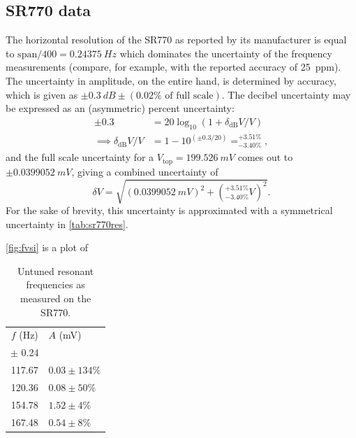 \documentclass{article}
\begin{document}
\subsection{SR770 data}
The horizontal resolution of the SR770 as reported by its manufacturer is equal to $\text{span}/400=\qty{0.24375}{Hz}$ which dominates the uncertainty of the frequency measurements (compare, for example, with the reported accuracy of \qty{25}{ppm}). The uncertainty in amplitude, on the entire hand, is determined by accuracy, which is given as $\pm\qty{0.3}{dB}\pm (0.02\%\text{ of full scale})$. The decibel uncertainty may be expressed as an (asymmetric) percent uncertainty:
\begin{equation*}
	\begin{aligned}
		\pm 0.3 &= 20 \log_{10}\left( 1 + \delta_\text{dB}V/V \right) \\
		\implies \delta_\text{dB}V/V &= 1- 10^{(\pm0.3/20)} = ^{+3.51\%}_{-3.40\%}%
,
	\end{aligned}
\end{equation*}
and the full scale uncertainty for a $V_\text{top}=\qty{199.526}{mV}$ comes out to $\pm \qty{0.0399052}{mV}$, giving a combined uncertainty of 
\begin{equation*}
	\delta V = \sqrt{\left( \qty{0.0399052}{mV} \right)^2 + \left( ^{+3.51\%}_{-3.40\%} V \right)^2}.
\end{equation*}
For the sake of brevity, this uncertainty is approximated with a symmetrical uncertainty in \autoref{tab:sr770res}.

\autoref{fig:fvsi} is a plot of 



\begin{table}
  \centering
  \caption{Untuned resonant frequencies as measured on the SR770.}
  \begin{tabular}{@{}cl@{}}
    \toprule
    $f$ (\unit{Hz}) & $A$ (\unit{mV}) \\
	$\pm$ 0.24 & \\
    \midrule
    117.67 & $0.03 \pm 134\%$ \\
	120.36 & $0.08 \pm 50\%$ \\
	154.78 & $1.52 \pm 4\%$ \\
	167.48 & $0.54 \pm 8\%$ \\
    \bottomrule
  \end{tabular}
  \label{tab:sr770res}
\end{table}
\end{document}
